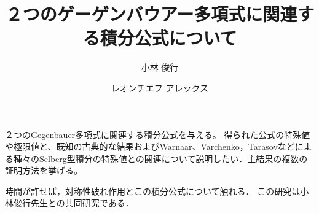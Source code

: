 \documentclass[12pt,a4paper,dvipdfmx]{article}
\title{２つのゲーゲンバウアー多項式に関連する積分公式について}
\author{小林 俊行}{東京大学 大学院数理科学研究科、カブリ数物連携宇宙研究機構}{Toshiyuki Kobayashi}{
Graduate School of Mathematical Sciences, the University of Tokyo,\\
Kavli Institute for the Physics and Mathematics of the Universe}
\author{レオンチエフ アレックス}{東京大学 大学院数理科学研究科}{Alex Leontiev}{Graduate School of Mathematical Sciences,
The University of Tokyo}
\theoremstyle{jplain}
\begin{document}
\maketitle
２つのGegenbauer多項式に関連する積分公式を与える。
得られた公式の特殊値や極限値と、既知の古典的な結果およびWarnaar、Varchenko，Tarasovなどによる種々のSelberg型積分の特殊値との関連について説明したい．主結果の複数の証明方法を挙げる。

時間が許せば，対称性破れ作用とこの積分公式について触れる． この研究は小林俊行先生との共同研究である．
\end{document}
